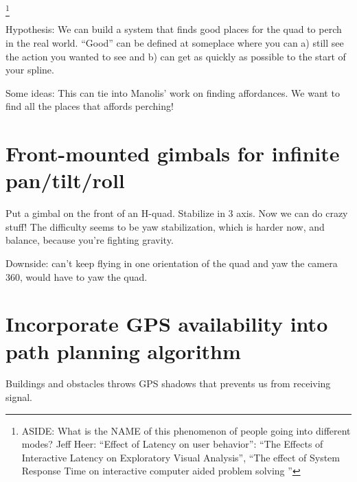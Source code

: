 \footnote{ASIDE: What is the NAME of this phenomenon of people going into different modes? Jeff Heer: ``Effect of Latency on user behavior'': ``The Effects of Interactive Latency on Exploratory Visual Analysis'', ``The effect of System Response Time on interactive computer aided problem solving
''}

Hypothesis: We can build a system that finds good places for the quad to perch in the real world. ``Good'' can be defined at someplace where you can a) still see the action you wanted to see and b) can get as quickly as possible to the start of your spline. 

Some ideas: This can tie into Manolis' work on finding affordances. We want to find all the places that affords perching!

\section{Front-mounted gimbals for infinite pan/tilt/roll}

Put a gimbal on the front of an H-quad. Stabilize in 3 axis. Now we can do crazy stuff! The difficulty seems to be yaw stabilization, which is harder now, and balance, because you're fighting gravity. 

Downside: can't keep flying in one orientation of the quad and yaw the camera 360, would have to yaw the quad.

\section{Incorporate GPS availability into path planning algorithm}

Buildings and obstacles throws GPS shadows that prevents us from receiving signal. 